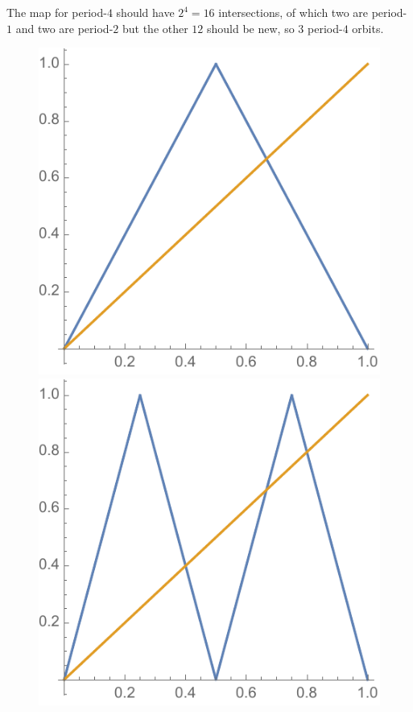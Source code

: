 \documentclass[12pt,letterpaper,noanswers]{exam}
\begin{document}
\begin{enumerate}
\begin{enumerate}
The map for period-$4$ should have $2^4=16$ intersections, of which two are period-$1$ and two are period-$2$ but the other $12$
should be new, so $3$ period-$4$ orbits.
\begin{figure}[h]
\includegraphics[scale=0.5]{img/C20map1.pdf}
\includegraphics[scale=0.5]{img/C20map2.pdf}

\end{figure}
\end{enumerate}
\end{enumerate}
\end{document}

